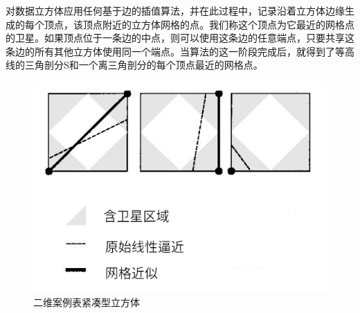 \begin{CJK}{UTF8}{gbsn}
对数据立方体应用任何基于边的插值算法，并在此过程中，记录沿着立方体边缘生成的每个顶点，该顶点附近的立方体网格的点。我们称这个顶点为它最近的网格点的卫星。如果顶点位于一条边的中点，则可以使用这条边的任意端点，只要共享这条边的所有其他立方体使用同一个端点。当算法的这一阶段完成后，就得到了等高线的三角剖分S和一个离三角剖分的每个顶点最近的网格点。
\begin{figure}[htbp]%
  \centering
  \includegraphics[totalheight=1.8in]{./fig/1.5.1.png}
  \caption{二维案例表紧凑型立方体} 
  \label{fig:1.5.1}
\end{figure}


\end{CJK}
